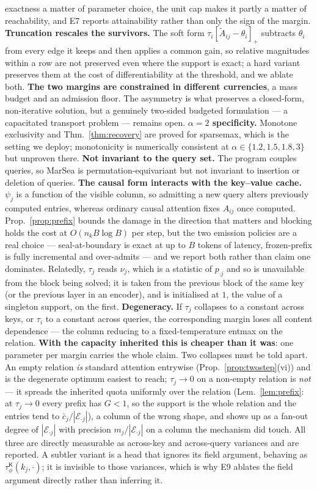 \documentclass{article}
\newcommand{\tauK}{\tau^{\mathsf{K}}_\phi}
\begin{document}
exactness a matter of parameter choice, the unit cap makes it partly a matter of reachability,
and E7 reports attainability rather than only the sign of the margin.
\textbf{Truncation rescales the survivors.} The soft form $\tau_i[\tilde A_{ij}-\theta_i]_+$
subtracts $\theta_i$ from every edge it keeps and then applies a common gain, so relative
magnitudes within a row are not preserved even where the support is exact; a hard variant
preserves them at the cost of differentiability at the threshold, and we ablate both. \textbf{The two margins are
constrained in different currencies}, a mass budget and an admission floor. The asymmetry is what
preserves a closed-form, non-iterative solution, but a genuinely two-sided budgeted formulation
--- a capacitated transport problem --- remains open. \textbf{$\alpha=2$ specificity.}
Monotone exclusivity and Thm.~\ref{thm:recovery} are proved for sparsemax, which is the
setting we deploy; monotonicity is numerically consistent at $\alpha\in\{1.2,1.5,1.8,3\}$ but
unproven there. \textbf{Not invariant to the query set.} The program couples queries, so MarSea is
permutation-equivariant but not invariant to insertion or deletion of queries. \textbf{The causal
form interacts with the key--value cache.} $\psi_j$ is a function of the visible column, so
admitting a new query alters previously computed entries, whereas ordinary causal attention fixes
$A_{ij}$ once computed. Prop.~\ref{prop:prefix} bounds the damage in the direction that matters
and blocking holds the cost at $O(n_kB\log B)$ per step, but the
two emission policies are a real choice --- seal-at-boundary is exact at up to $B$ tokens of
latency, frozen-prefix is fully incremental and over-admits --- and we report
both rather than claim one dominates. Relatedly, $\tau_j$ reads $\nu_j$, which is a statistic of $p_{\cdot j}$ and so is unavailable
from the block being solved; it is taken from the previous block of the same key (or the previous
layer in an encoder), and is initialised at $1$, the value of a singleton support, on the first.
\textbf{Degeneracy.} If $\tau_j$ collapses to a constant across keys, or $\tau_i$ to a constant
across queries, the corresponding margin loses all content dependence --- the column reducing to
a fixed-temperature entmax on the relation. \textbf{With the capacity inherited this is cheaper
than it was}: one parameter per margin carries the whole claim. Two collapses must be told
apart. An empty relation \emph{is} standard attention entrywise (Prop.~\ref{prop:twostep}(vi))
and is the degenerate optimum easiest to reach; $\tau_j\to0$ on a non-empty relation is
\emph{not} --- it spreads the inherited quota uniformly over the relation
(Lem.~\ref{lem:prefix}: at $\tau_j\to0$ every prefix has $G<1$, so the support is the whole relation and the entries tend to $\bar c_j/|\mathcal{E}_{\cdot j}|$), a column of the wrong shape, and shows up as a fan-out degree of
$|\mathcal{E}_{\cdot j}|$ with precision $m_j/|\mathcal{E}_{\cdot j}|$ on a column the mechanism
did touch. All three are directly measurable as across-key and across-query variances and are
reported. A subtler variant is a head that ignores its field argument, behaving as
$\tauK(k_j,\cdot)$; it is invisible to those variances, which is why E9 ablates the field
argument directly rather than inferring it.
\end{document}
